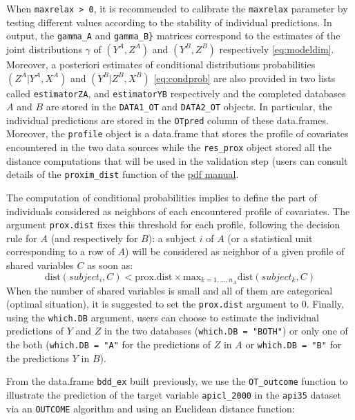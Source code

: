 When \texttt{maxrelax\ \textgreater{}\ 0}, it is recommended to calibrate the \texttt{maxrelax} parameter by testing different values according to the stability of individual predictions. In output, the \texttt{gamma\_A} and \texttt{gamma\_B\}} matrices correspond to the estimates of the joint distributions \(\gamma\) of \((Y^A,Z^A)\) and \((Y^B,Z^B)\) respectively \eqref{eq:modeldim}. Moreover, a posteriori estimates of conditional distributions probabilities \((Z^A|Y^A, X^A)\) and \((Y^B|Z^B,X^B)\) \eqref{eq:condprob} are also provided in two lists called \texttt{estimatorZA}, and \texttt{estimatorYB} respectively and the completed databases \(A\) and \(B\) are stored in the \texttt{DATA1\_OT} and \texttt{DATA2\_OT} objects. In particular, the individual predictions are stored in the \texttt{OTpred} column of these data.frames. Moreover, the \texttt{profile} object is a data.frame that stores the profile of covariates encountered in the two data sources while the \texttt{res\_prox} object stored all the distance computations that will be used in the validation step (users can consult details of the \texttt{proxim\_dist} function of the \href{https://cran.r-project.org//web//packages//OTrecod//OTrecod.pdf}{pdf manual}.

The computation of conditional probabilities implies to define the part of individuals considered as neighbors of each encountered profile of covariates. The argument \texttt{prox.dist} fixes this threshold for each profile, following the decision rule for \(A\) (and respectively for \(B\)): a subject \(i\) of \(A\) (or a statistical unit corresponding to a row of \(A\)) will be considered as neighbor of a given profile of shared variables \(C\) as soon as:
\[
 \text{dist}(subject_i,C) <  \text{prox.dist} \times \text{max}_{k=1,\dots , n_A}  \text{dist}(subject_k,C)
 \]
When the number of shared variables is small and all of them are categorical (optimal situation), it is suggested to set the \texttt{prox.dist} argument to \(0\). Finally, using the \texttt{which.DB} argument, users can choose to estimate the individual predictions of \(Y\) and \(Z\) in the two databases (\texttt{which.DB\ =\ "BOTH"}) or only one of the both (\texttt{which.DB\ =\ "A"} for the predictions of \(Z\) in \(A\) or \texttt{which.DB\ =\ "B"} for the predictions \(Y\) in \(B\)).

From the data.frame \texttt{bdd\_ex} built previously, we use the \texttt{OT\_outcome} function to illustrate the prediction of the target variable \texttt{apicl\_2000} in the \texttt{api35} dataset via an \texttt{OUTCOME} algorithm and using an Euclidean distance function:

